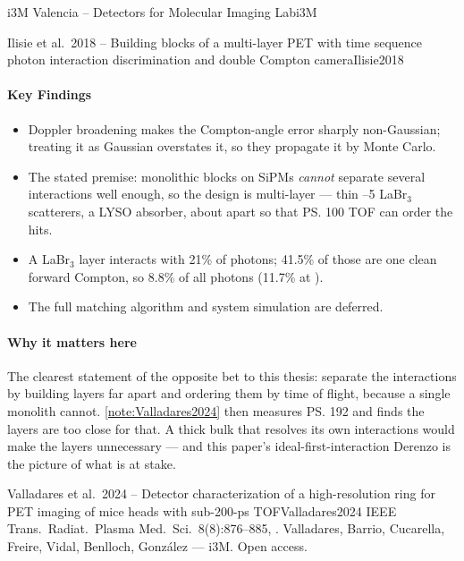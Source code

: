 \begin{programnote}{i3M Valencia -- Detectors for Molecular Imaging Lab}{i3M}
\begin{papernote}{Ilisie et al.\ 2018 -- Building blocks of a multi-layer PET with time sequence photon interaction discrimination and double Compton camera}{Ilisie2018}
\paragraph{Key Findings}
\begin{itemize}
	\item Doppler broadening makes the Compton-angle error sharply non-Gaussian;
		treating it as Gaussian overstates it, so they propagate it by Monte
		Carlo.
	\item The stated premise: monolithic blocks on SiPMs \emph{cannot}
		separate several interactions well enough, so the design is
		multi-layer --- thin --5 LaBr$_3$ scatterers, a  LYSO
		absorber, about  apart so that \ps{100} TOF can order the hits.
	\item A  LaBr$_3$ layer interacts with 21\% of photons; 41.5\% of
		those are one clean forward Compton, so 8.8\% of all photons (11.7\% at
		).
	\item The full matching algorithm and system simulation are deferred.
\end{itemize}

\paragraph{Why it matters here}
The clearest statement of the opposite bet to this thesis: separate the
interactions by building layers far apart and ordering them by time of flight,
because a single monolith cannot. \ref{note:Valladares2024} then measures
\ps{192} and finds the layers are too close for that. A thick bulk that
resolves its own interactions would make the layers unnecessary --- and this
paper's ideal-first-interaction Derenzo is the picture of what is at stake.

\end{papernote}

\begin{papernote}{Valladares et al.\ 2024 -- Detector characterization of a high-resolution ring for PET imaging of mice heads with sub-200-ps TOF}{Valladares2024}
IEEE Trans.\ Radiat.\ Plasma Med.\ Sci.\ 8(8):876--885,
. Valladares, Barrio, Cucarella, Freire, Vidal,
Benlloch, González --- i3M. Open access.


\end{papernote}
\end{programnote}
